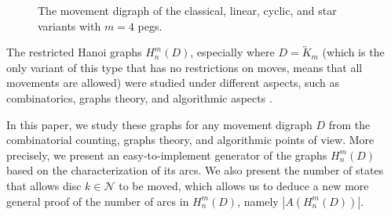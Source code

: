 \documentclass[letterpaper,11pt]{article}
\begin{document}
\begin{figure}[H]
\begin{tikzpicture}[x=0.75pt,y=0.75pt,yscale=-1,xscale=1]
\end{tikzpicture}

    \caption{The movement digraph of the classical, linear, cyclic, and star variants with $m=4$ pegs.}
    \label{fig:my_label}
\end{figure}

The restricted Hanoi graphs $H_{n}^{m}(D)$, especially where $D=\overleftrightarrow{K}_{m}$ (which is the only variant of this type that has no restrictions on moves, means that all movements are allowed) were studied under different aspects, such as combinatorics, graphs theory, and algorithmic aspects \cite{berend2006diameter,klavvzar2005hanoi,azriel2008infinite,leiss2013worst}. 

In this paper, we study these graphs for any movement digraph $D$ from the combinatorial counting, graphs theory, and algorithmic points of view. More precisely, we present an easy-to-implement generator of the graphs $H_{n}^{m}(D)$ based on the characterization of its arcs. We also present the number of states that allows disc $k\in\mathcal{N}$ to be moved, which allows us to deduce a new more general proof of the number of arcs in $H_{n}^{m}(D)$, namely $|A(H_{n}^{m}(D))|$.
\end{document}
